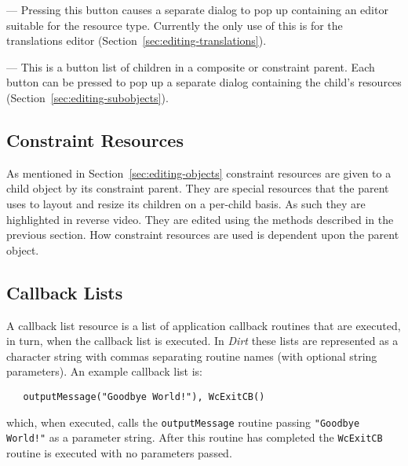 \vspace{.1in}
\begin{minipage}[t]{1.2in}
\end{minipage}
--- Pressing this button causes a separate dialog to pop up containing an editor
suitable for the resource type.  Currently the only use of this is for the
translations editor (Section~\ref{sec:editing-translations}).

\vspace{.1in}
\begin{minipage}[t]{1in}
\end{minipage}
--- This is a button list of children in a composite or constraint parent.
Each button can be pressed to pop up a separate dialog containing the child's
resources (Section~\ref{sec:editing-subobjects}).

\subsection{Constraint Resources}
\label{sec:editing-constraints}
As mentioned in Section~\ref{sec:editing-objects} constraint resources are
given to a child object by its constraint parent.  They are special resources
that the parent uses to layout and resize its children on a per-child basis.
As such they are highlighted in reverse video.  They are edited using the
methods described in the previous section.  How constraint resources are
used is dependent upon the parent object.

\subsection{Callback Lists}
\label{sec:editing-callbacks}
A callback list resource is a list of application callback routines that are
executed, in turn, when the callback list is executed.  In {\em Dirt}
these lists are represented as a character string with commas separating
routine names (with optional string parameters).  An example callback list
is:\begin{verbatim}
   outputMessage("Goodbye World!"), WcExitCB()
\end{verbatim}
which, when executed, calls the {\tt outputMessage} routine passing
{\tt "Goodbye World!"} as a parameter string.  After this routine has
completed the {\tt WcExitCB} routine is executed with no parameters passed.

